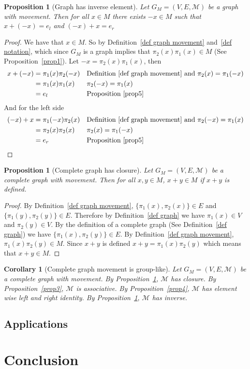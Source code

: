 \documentclass{article}
\theoremstyle{plain}
\newtheorem{proposition}[theorem]{Proposition}
\newtheorem{corollary}[theorem]{Corollary}
\theoremstyle{definition}
\begin{document}
\begin{proposition}[Graph has inverse element]\label{prop5}
	Let $G_M =(V,E,\mathcal{M})$ be a graph with movement. Then for all $x \in
	M$ there exists $-x \in M$ such that $x+(-x) = e_l$ and $(-x)+x = e_r$
\end{proposition}
\begin{proof}
	We have that $x \in M$. So by Definition~\ref{def graph movement}
	and~\ref{def notation}, which since $G_M$ is a graph implies that
	$\pi_2(x)\pi_1(x) \in M$ (See Proposition~\ref{prop1}). Let $-x =
	\pi_2(x)\pi_1(x)$, then
	\begin{equation}
	\begin{aligned}
		x+(-x) &= \pi_1(x)\pi_2(-x) && \text{Definition~\ref{def graph
		movement} and $\pi_2(x)= \pi_1(-x)$} \\
		&= \pi_1(x)\pi_1(x) && \text{$\pi_2(-x)= \pi_1(x)$} \\
		&= e_l && \text{Proposition~\ref{prop5}} \\
	\end{aligned}
	\end{equation}
	And for the left side
	\begin{equation}
	\begin{aligned}
		(-x)+x &= \pi_1(-x)\pi_2(x) && \text{Definition~\ref{def graph
		movement} and $\pi_2(-x)= \pi_1(x)$} \\
		&= \pi_2(x)\pi_2(x) && \text{$\pi_2(x)= \pi_1(-x)$} \\
		&= e_r && \text{Proposition~\ref{prop5}} \\
	\end{aligned}
	\end{equation}
\end{proof}
\begin{proposition}[Complete graph has closure]\label{prop6}
	Let $G_M =(V,E,\mathcal{M})$ be a complete graph with movement. Then for all
	$x,y \in M$, $x+y \in M$ if $x+y$ is defined.
\end{proposition}
\begin{proof}
	By Definition~\ref{def graph movement}, $\{\pi_1(x),\pi_2(x)\} \in E$ and
	$\{\pi_1(y),\pi_2(y)\} \in E$. Therefore by Definition~\ref{def graph} we
	have $\pi_1(x)\in V$ and $\pi_2(y) \in V$. By the definition of a complete
	graph (See Definition~\ref{def graph}) we have $\{\pi_1(x),\pi_2(y)\} \in
	E$. By Definition~\ref{def graph movement}, $\pi_1(x)\pi_2(y) \in M$. Since
	$x+y$ is defined $x+y=\pi_1(x)\pi_2(y)$ which means that $x+y\in M$.
\end{proof}
\begin{corollary}[Complete graph movement is group-like]\label{cor1}
	Let $G_M=(V,E,\mathcal{M})$ be a complete graph with movement. 
	By Proposition~\ref{prop6}, $\mathcal{M}$ has closure. By Proposition~\ref{prop3},
	$\mathcal{M}$ is associative. By Proposition~\ref{prop4}, $\mathcal{M}$ has
	element wise left and right identity. By Proposition~\ref{prop5},
	$\mathcal{M}$ has inverse.
\end{corollary}
\subsection{Applications}
\section{Conclusion}
\end{document}
